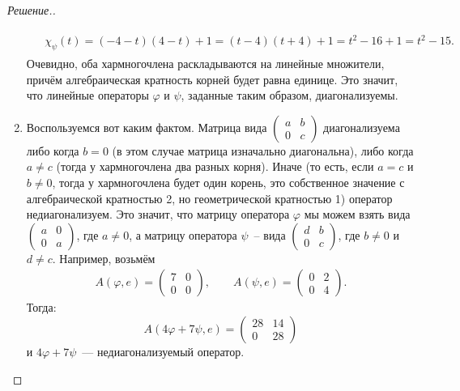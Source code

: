 \documentclass[a4paper]{article}
\theoremstyle{remark}
\begin{document}
\begin{proof}[Решение.]
\begin{enumerate}[label=\arabic*)]
\begin{align*}
            &\begin{aligned}
              \chi_\psi(t) = (-4 - t)(4 - t) + 1 = (t - 4)(t + 4) + 1 = t^2 - 16 + 1 = t^2 - 15. 
            \end{aligned}
          \end{align*}
          Очевидно, оба хармногочлена раскладываются на линейные множители, причём алгебраическая кратность корней будет равна единице. Это значит, что линейные операторы $\varphi$ и $\psi$, заданные таким образом, диагонализуемы.
          \item Воспользуемся вот каким фактом. Матрица вида $\begin{pmatrix}
            a & b \\
            0 & c
          \end{pmatrix}$ диагонализуема либо когда $b = 0$ (в этом случае матрица изначально диагональна), либо когда $a \neq c$ (тогда у хармногочлена два разных корня). Иначе (то есть, если $a = c$ и $b \neq 0$, тогда у хармногочлена будет один корень, это собственное значение с алгебраической кратностью 2, но геометрической кратностью 1) оператор недиагонализуем. Это значит, что матрицу оператора $\varphi$ мы можем взять вида $\begin{pmatrix}
            a & 0 \\
            0 & a
          \end{pmatrix}$, где $a \neq 0$, а матрицу оператора $\psi$~-- вида $\begin{pmatrix}
            d & b \\
            0 & c
          \end{pmatrix}$, где $b \neq 0$ и $d \neq c$.
          Например, возьмём 
          \begin{align*}
            A(\varphi, e) = \begin{pmatrix}
              7 & 0 \\
              0 & 0
            \end{pmatrix}, \quad\quad A(\psi, e) = \begin{pmatrix}
              0 & 2 \\
              0 & 4
            \end{pmatrix}.
          \end{align*}
          Тогда:
          \begin{equation*}
            A(4\varphi + 7\psi, e) = \begin{pmatrix}
              28 & 14 \\
              0 & 28
            \end{pmatrix}
          \end{equation*}
          и $4\varphi + 7\psi$~--- недиагонализуемый оператор.
        \end{enumerate}

        \end{proof}
    
\end{document}
